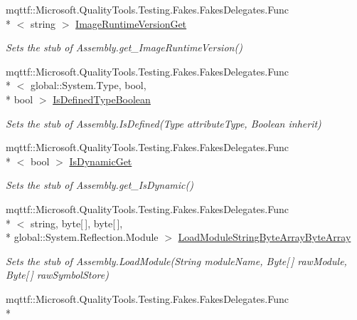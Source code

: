 \begin{DoxyCompactItemize}
mqttf\-::\-Microsoft.\-Quality\-Tools.\-Testing.\-Fakes.\-Fakes\-Delegates.\-Func\\*
$<$ string $>$ \hyperlink{class_system_1_1_reflection_1_1_fakes_1_1_stub_assembly_aad4b98362fa1377f9cb4dfa34d50c32f}{Image\-Runtime\-Version\-Get}
\begin{DoxyCompactList}\small\item\em Sets the stub of Assembly.\-get\-\_\-\-Image\-Runtime\-Version()\end{DoxyCompactList}\item 
mqttf\-::\-Microsoft.\-Quality\-Tools.\-Testing.\-Fakes.\-Fakes\-Delegates.\-Func\\*
$<$ global\-::\-System.\-Type, bool, \\*
bool $>$ \hyperlink{class_system_1_1_reflection_1_1_fakes_1_1_stub_assembly_a36cc43fc82785b455fb3b5a1eb89dd76}{Is\-Defined\-Type\-Boolean}
\begin{DoxyCompactList}\small\item\em Sets the stub of Assembly.\-Is\-Defined(\-Type attribute\-Type, Boolean inherit)\end{DoxyCompactList}\item 
mqttf\-::\-Microsoft.\-Quality\-Tools.\-Testing.\-Fakes.\-Fakes\-Delegates.\-Func\\*
$<$ bool $>$ \hyperlink{class_system_1_1_reflection_1_1_fakes_1_1_stub_assembly_afa95e8cb53a4e138f215a312bb98b361}{Is\-Dynamic\-Get}
\begin{DoxyCompactList}\small\item\em Sets the stub of Assembly.\-get\-\_\-\-Is\-Dynamic()\end{DoxyCompactList}\item 
mqttf\-::\-Microsoft.\-Quality\-Tools.\-Testing.\-Fakes.\-Fakes\-Delegates.\-Func\\*
$<$ string, byte\mbox{[}$\,$\mbox{]}, byte\mbox{[}$\,$\mbox{]}, \\*
global\-::\-System.\-Reflection.\-Module $>$ \hyperlink{class_system_1_1_reflection_1_1_fakes_1_1_stub_assembly_ab29060d20df2caf487cc9b8101538cea}{Load\-Module\-String\-Byte\-Array\-Byte\-Array}
\begin{DoxyCompactList}\small\item\em Sets the stub of Assembly.\-Load\-Module(\-String module\-Name, Byte\mbox{[}$\,$\mbox{]} raw\-Module, Byte\mbox{[}$\,$\mbox{]} raw\-Symbol\-Store)\end{DoxyCompactList}\item 
mqttf\-::\-Microsoft.\-Quality\-Tools.\-Testing.\-Fakes.\-Fakes\-Delegates.\-Func\\*

\end{DoxyCompactItemize}
